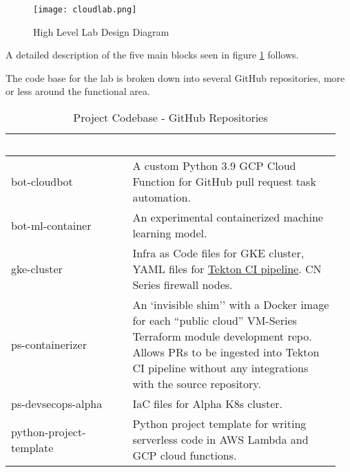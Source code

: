 \begin{figure}[ht]
	\texttt{[image: cloudlab.png]}
	\caption{High Level Lab Design Diagram}
	\label{design}
\end{figure}

\justifying
A detailed description of the five main blocks seen in figure \ref{design} follows.

\newpage
{}

\justifying
The code base for the lab is broken down into several GitHub repositories, more or less around the functional area.

\begin{table}[ht]
	\centering
	\begin{tabular}{| p{0.35\linewidth} | p{0.6\linewidth} |} \hline
		\cellcolor{myblue}\textcolor{white}{Repo Name} & \cellcolor{myblue}\textcolor{white}{Purpose}                                                                                     \\\hline
		bot-cloudbot                                   & A custom Python 3.9 GCP Cloud Function for GitHub pull request task automation.                                                  \\\hline
		bot-ml-container                               & An experimental containerized machine learning model.                                                                            \\\hline
		gke-cluster                                    & Infra as Code files for GKE cluster, YAML files for \href{https://tekton.dev/}{Tekton CI pipeline}. CN Series firewall nodes.    \\\hline
		ps-containerizer                               & An `invisible shim'' with a Docker image for each ``public cloud'' VM-Series Terraform module development repo. Allows PRs to be
		ingested into Tekton CI pipeline without any integrations with the source repository.                                                                                             \\\hline
		ps-devsecops-alpha                             & IaC files for Alpha K8s cluster.                                                                                                 \\\hline
		python-project-template                        & Python project template for writing serverless code in AWS Lambda and GCP cloud functions.                                       \\\hline
	\end{tabular}
	\caption{Project Codebase - GitHub Repositories}
	\label{mytable:1}
\end{table}
\vspace{2mm}
\vspace{2mm}

